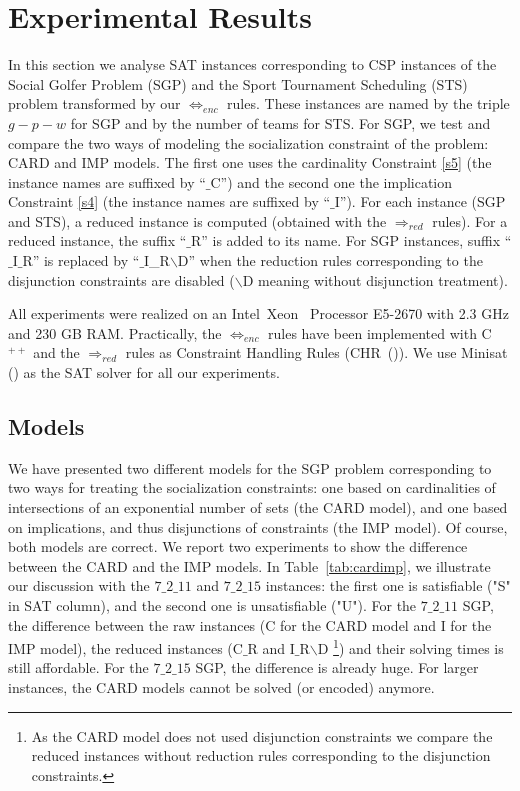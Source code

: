\documentclass[3p,authoryear,times]{elsarticle}
\newcommand{\rmin}[0]{{\Rightarrow_{red}}}
\newcommand{\enc}[0]{\Leftrightarrow_{enc}}
\begin{document}
\section{Experimental Results}
\label{sec:expe}

In this section we analyse SAT instances corresponding to CSP instances of the Social Golfer Problem (SGP) and the Sport Tournament Scheduling (STS) problem transformed by our $\enc$ rules.  These instances are named by  the triple $g-p-w$ for SGP and by the number of teams for STS.
For SGP, we test and compare the two ways of modeling  the {socialization constraint} of the problem: CARD and IMP models. The first one uses the cardinality Constraint \ref{s5} (the instance names are suffixed by ``$\_$C'') and the second one  the implication Constraint \ref{s4} (the instance names are suffixed by ``$\_$I'').
For each instance (SGP and STS), a reduced instance is computed (obtained with the  $\rmin$ rules). For a reduced instance, the suffix ``$\_$R'' is added to its name. For SGP instances, suffix  ``$\_$I$\_$R'' is replaced by  ``$\_$I\_R$\backslash$D'' when the reduction rules corresponding to the disjunction constraints are disabled ($\backslash$D meaning without disjunction treatment). 
 
All experiments were realized on an Intel\textregistered ~Xeon\textregistered~ Processor E5-2670 with 2.3 GHz and 230 GB RAM. Practically, the $\enc$ rules  have been implemented  with C$^{++}$ and the $\rmin$ rules as Constraint Handling Rules (CHR~(\cite{chr})). We use Minisat (\cite{minisat03}) as the SAT solver for all our experiments.


\subsection{Models}
We have presented two different models for the SGP problem corresponding to two ways for treating the socialization constraints: one based on cardinalities of intersections of an exponential number of sets (the CARD model), and one based on implications, and thus disjunctions of constraints (the IMP model). Of course, both models are correct. We report two experiments to show the difference between the CARD and the IMP models. In Table~\ref{tab:cardimp}, we illustrate our discussion with the $7\_2\_11$ and $7\_2\_15$ instances: the first one is satisfiable ("S" in SAT column), and the second one is unsatisfiable ("U"). For the $7\_2\_11$ SGP, the difference between the raw instances (C for the CARD model and I for the IMP model), the reduced instances (C$\_$R and I$\_$R$\backslash$D \footnote{As the CARD model does not used disjunction constraints we compare the reduced instances without reduction rules corresponding to the disjunction constraints.})  and their solving times is still affordable. For the $7\_2\_15$ SGP, the difference is already huge. For larger instances, the CARD models cannot be solved (or encoded) anymore.
\end{document}
